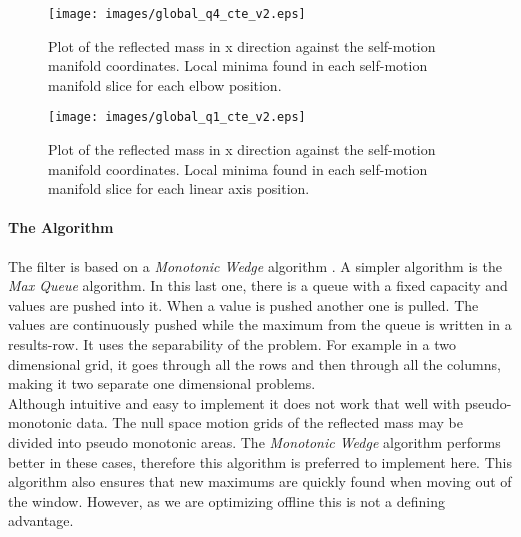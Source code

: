 \begin{figure}[htb]
	\centerline{
		\texttt{[image: images/global\_q4\_cte\_v2.eps]}}
	\caption{Plot of the reflected mass in x direction against the self-motion
		manifold coordinates. Local minima found in each self-motion manifold slice for each elbow position. }
	\label{fig:maxminfilter1}
\end{figure}

\begin{figure}[htb]
	\centerline{
		\texttt{[image: images/global\_q1\_cte\_v2.eps]}}
	\caption{Plot of the reflected mass in x direction against the self-motion
		manifold coordinates. Local minima found in each self-motion manifold slice for each linear axis position. }
	\label{fig:maxminfilter2}
\end{figure}





\paragraph{The Algorithm}
\label{subsec:global_alg}

The filter is based on a \textit{Monotonic Wedge} algorithm \cite{Lemire}.
A simpler algorithm is the \textit{Max Queue} algorithm. In this last one, there is a queue with a fixed capacity and values are pushed into it. When a value is pushed another one is pulled. The values are continuously pushed while the maximum from the queue is written in a results-row.
It uses the separability of the problem.  For example in a two dimensional grid, it goes through all the rows and then through all the columns, making it two separate one dimensional problems.\\
%
Although intuitive and easy to implement it does not work that well with pseudo-monotonic data. The null space motion grids of the reflected mass may be divided into pseudo monotonic areas. The \textit{Monotonic Wedge} algorithm performs better in these cases, therefore this algorithm is preferred to implement here. This algorithm also ensures that new maximums are quickly found when moving out of the window. However, as we are optimizing offline this is not a defining advantage.


